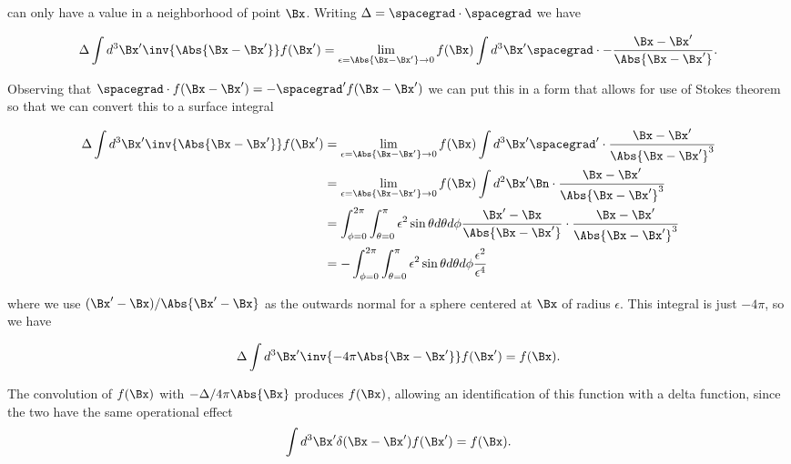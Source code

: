 can only have a value in a neighborhood of point $\Bx$.  Writing $\Delta = \spacegrad \cdot \spacegrad$ we have

\begin{equation}\label{eqn:relativisticElectrodynamicsL18:320}
\Delta \int d^3 \Bx' \inv{\Abs{\Bx - \Bx'} } f(\Bx') 
=
\lim_{\epsilon = \Abs{\Bx -\Bx'} \rightarrow 0}
f(\Bx) \int d^3 \Bx' \spacegrad \cdot -\frac{\Bx - \Bx'}{\Abs{\Bx - \Bx'}}.
\end{equation}

Observing that $\spacegrad \cdot f(\Bx -\Bx') = -\spacegrad' f(\Bx - \Bx')$ we can put this in a form that allows for use of Stokes theorem so that we can convert this to a surface integral

\begin{equation}\label{eqn:relativisticElectrodynamicsL18:820}
\begin{aligned}
\Delta \int d^3 \Bx' \inv{\Abs{\Bx - \Bx'} } f(\Bx') 
&=
\lim_{\epsilon = \Abs{\Bx -\Bx'} \rightarrow 0}
f(\Bx) \int d^3 \Bx' \spacegrad' \cdot \frac{\Bx - \Bx'}{\Abs{\Bx - \Bx'}^3} \\
&=
\lim_{\epsilon = \Abs{\Bx -\Bx'} \rightarrow 0}
f(\Bx) \int d^2 \Bx' \Bn \cdot \frac{\Bx - \Bx'}{\Abs{\Bx - \Bx'}^3} \\
&= \int_{\phi=0}^{2\pi} \int_{\theta = 0}^\pi \epsilon^2 \sin\theta d\theta d\phi 
\frac{\Bx' - \Bx}{\Abs{\Bx - \Bx'}} \cdot \frac{\Bx - \Bx'}{\Abs{\Bx - \Bx'}^3} \\
&= -\int_{\phi=0}^{2\pi} \int_{\theta = 0}^\pi \epsilon^2 \sin\theta d\theta d\phi \frac{\epsilon^2}{\epsilon^4}
\end{aligned}
\end{equation}

where we use $(\Bx' - \Bx)/\Abs{\Bx' - \Bx}$ as the outwards normal for a sphere centered at $\Bx$ of radius $\epsilon$.  This integral is just $-4 \pi$, so we have

\begin{equation}\label{eqn:relativisticElectrodynamicsL18:360}
\Delta \int d^3 \Bx' \inv{-4 \pi \Abs{\Bx - \Bx'} } f(\Bx') 
=
f(\Bx).
\end{equation}

The convolution of $f(\Bx)$ with $-\Delta/4 \pi \Abs{\Bx}$ produces $f(\Bx)$, allowing an identification of this function with a delta function, since the two have the same operational effect
\begin{equation}\label{eqn:relativisticElectrodynamicsL18:380}
\int d^3 \Bx' \delta(\Bx - \Bx') f(\Bx') 
=
f(\Bx).
\end{equation}

